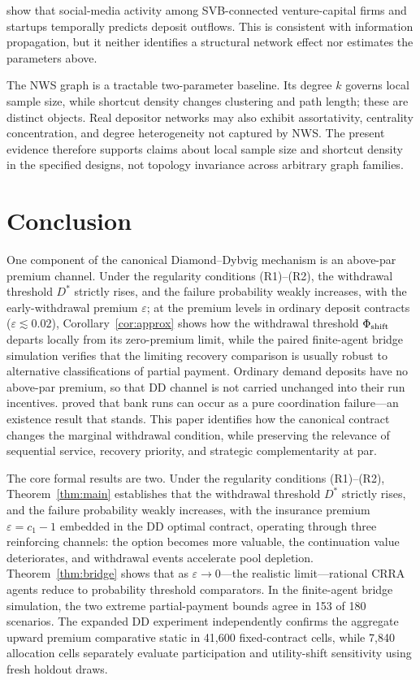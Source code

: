 \documentclass[12pt]{article}\usepackage[]{graphicx}\usepackage[]{xcolor}
\begin{document}
\citet{cookson2023social} show that social-media activity among SVB-connected venture-capital firms and startups temporally predicts deposit outflows.
This is consistent with information propagation, but it neither identifies a structural network effect nor estimates the parameters above.

The NWS graph is a tractable two-parameter baseline.
Its degree $k$ governs local sample size, while shortcut density changes clustering and path length; these are distinct objects.
Real depositor networks may also exhibit assortativity, centrality concentration, and degree heterogeneity not captured by NWS.
The present evidence therefore supports claims about local sample size and shortcut density in the specified designs, not topology invariance across arbitrary graph families.

\section{Conclusion}
\label{sec:conclusion}

One component of the canonical Diamond--Dybvig mechanism is an above-par premium channel.
Under the regularity conditions (R1)--(R2), the withdrawal threshold $D^*$ strictly rises, and the failure probability weakly increases, with the early-withdrawal premium $\varepsilon$; at the premium levels in ordinary deposit contracts ($\varepsilon \lesssim 0.02$), Corollary~\ref{cor:approx} shows how the withdrawal threshold $\Phi_{\rm shift}$ departs locally from its zero-premium limit, while the paired finite-agent bridge simulation verifies that the limiting recovery comparison is usually robust to alternative classifications of partial payment.
Ordinary demand deposits have no above-par premium, so that DD channel is not carried unchanged into their run incentives.
\citet{diamond1983bank} proved that bank runs can occur as a pure coordination failure---an existence result that stands.
This paper identifies how the canonical contract changes the marginal withdrawal condition, while preserving the relevance of sequential service, recovery priority, and strategic complementarity at par.

The core formal results are two.
Under the regularity conditions (R1)--(R2), Theorem~\ref{thm:main} establishes that the withdrawal threshold $D^*$ strictly rises, and the failure probability weakly increases, with the insurance premium $\varepsilon=c_1-1$ embedded in the DD optimal contract, operating through three reinforcing channels: the option becomes more valuable, the continuation value deteriorates, and withdrawal events accelerate pool depletion.
Theorem~\ref{thm:bridge} shows that as $\varepsilon \to 0$---the realistic limit---rational CRRA agents reduce to probability threshold comparators.
In the finite-agent bridge simulation, the two extreme partial-payment bounds agree in 153 of 180 scenarios.
The expanded DD experiment independently confirms the aggregate upward premium comparative static in 41{,}600 fixed-contract cells, while 7{,}840 allocation cells separately evaluate participation and utility-shift sensitivity using fresh holdout draws.
\end{document}
